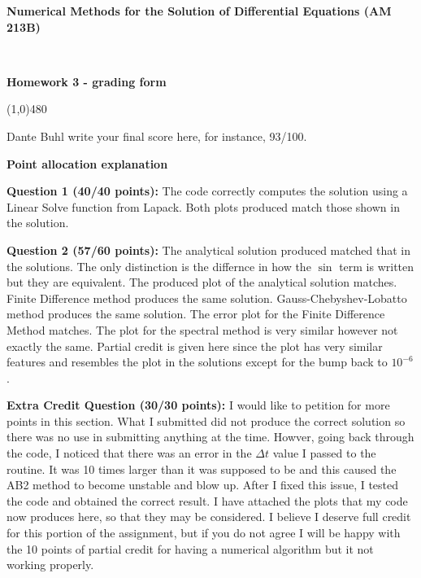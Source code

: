 \documentclass[10pt,english]{article}
\def\vss{\vspace{1cm}}
\def\vs{\vspace{0.2cm}}
\begin{document}
\noindent
\centerline{
\textbf{\large Numerical Methods for the Solution of Differential Equations (AM 213B)}}\\
\centerline{{\bf Homework 3 - grading form}}
%
\centerline{\line(1,0){480}}\vspace{.cm}

\vspace{0.2cm}
 Dante Buhl
\vs
{} write your final score here, for instance, 93/100.

\vss\noindent
\centerline{\bf Point allocation explanation}


\vs
{\bf Question 1 (40/40 points):} The code correctly computes the solution using
a Linear Solve function from Lapack. Both plots produced match those shown in
the solution. 

\vs   
{\bf Question 2 (57/60 points):} The analytical solution produced matched that in
the solutions. The only distinction is the differnce in how the $\sin$ term is
written but they are equivalent. The produced plot of the analytical solution
matches. Finite Difference method produces the same solution.
Gauss-Chebyshev-Lobatto method produces the same solution. The error plot for
the Finite Difference Method matches. The plot for the spectral method is very
similar however not exactly the same. Partial credit is given here since the
plot has very similar features and resembles the plot in the solutions except
for the bump back to $10^{-6}$. 

\vs
{\bf Extra Credit Question (30/30 points):} I would like to petition for more
points in this section. What I submitted did not produce the correct solution so
there was no use in submitting anything at the time. Howver, going back through
the code, I noticed that there was an error in the $\Delta t$ value I passed to the
routine. It was 10 times larger than it was supposed to be and this caused the
AB2 method to become unstable and blow up. After I fixed this issue, I tested
the code and obtained the correct result. I have attached the plots that my code
now produces here, so that they may be considered. I believe I deserve full
credit for this portion of the assignment, but if you do not agree I will be
happy with the 10 points of partial credit for having a numerical algorithm but
it not working properly. 
\end{document}
